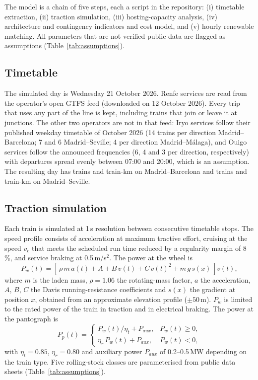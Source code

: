The model is a chain of five steps, each a script in the repository: (i) timetable extraction, (ii) traction simulation, (iii) hosting-capacity analysis, (iv) architecture and contingency indicators and cost model, and (v) hourly renewable matching. All parameters that are not verified public data are flagged as assumptions (Table~\ref{tab:assumptions}).

\subsection{Timetable}

The simulated day is Wednesday 21 October 2026. Renfe services are read from the operator's open GTFS feed (downloaded on 12 October 2026). Every trip that uses any part of the line is kept, including trains that join or leave it at junctions. The other two operators are not in that feed: Iryo services follow their published weekday timetable of October 2026 (14 trains per direction Madrid--Barcelona; 7 and 6 Madrid--Seville; 4 per direction Madrid--M\'alaga), and Ouigo services follow the announced frequencies (6, 4 and 3 per direction, respectively) with departures spread evenly between 07:00 and 20:00, which is an assumption. The resulting day has \mzbTrains{} trains and \mzbTrainKm{} train-km on Madrid--Barcelona and \msTrains{} trains and \msTrainKm{} train-km on Madrid--Seville.

\subsection{Traction simulation}

Each train is simulated at 1\,s resolution between consecutive timetable stops. The speed profile consists of acceleration at maximum tractive effort, cruising at the speed $v_c$ that meets the scheduled run time reduced by a regularity margin of 8\,\%, and service braking at 0.5\,m/s$^2$. The power at the wheel is
\begin{equation}
P_w(t) = \left[\,\rho\, m\, a(t) + A + B\,v(t) + C\,v(t)^2 + m\,g\,s(x)\,\right] v(t),
\label{eq:wheel}
\end{equation}
where $m$ is the laden mass, $\rho=1.06$ the rotating-mass factor, $a$ the acceleration, $A$, $B$, $C$ the Davis running-resistance coefficients \cite{rochard2000} and $s(x)$ the gradient at position $x$, obtained from an approximate elevation profile ($\pm50$\,m). $P_w$ is limited to the rated power of the train in traction and in electrical braking. The power at the pantograph is
\begin{equation}
P_p(t) =
\begin{cases}
P_w(t)/\eta_t + P_{aux}, & P_w(t) \ge 0,\\
\eta_r\,P_w(t) + P_{aux}, & P_w(t) < 0,
\end{cases}
\label{eq:panto}
\end{equation}
with $\eta_t=0.85$, $\eta_r=0.80$ and auxiliary power $P_{aux}$ of 0.2--0.5\,MW depending on the train type. Five rolling-stock classes are parameterised from public data sheets (Table~\ref{tab:assumptions}).

